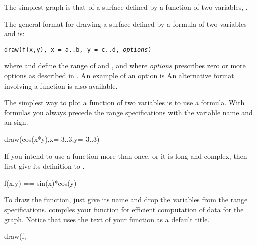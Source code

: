 The simplest \threedim{} graph is that of a surface defined by a function
of two variables, .

%
\beginImportant
The general format for drawing a surface defined by a formula 
of two variables  and  is:
%
\begin{center}
{\tt draw(f(x,y), x = a..b, y = c..d, {\it options})}
\end{center}
where  and  define the range of 
and , and where {\it options} prescribes zero or more
options as described in .
An example of an option is 
An alternative format involving a function  is also
available.
\endImportant

%
\begin{psXtc}
\begin{xtccomment}
The simplest way to plot a function of two variables is to use a formula.
With formulas you always precede the range specifications with
the variable name and an \spadSyntax{=} sign.
\end{xtccomment}
\begin{spadsrc}
draw(cos(x*y),x=-3..3,y=-3..3)
\end{spadsrc}
\end{psXtc}
%
\begin{xtc}
\begin{xtccomment}
If you intend to use a function more than once,
or it is long and complex, then first
give its definition to \Language{}.
\end{xtccomment}
\begin{spadsrc}
f(x,y) == sin(x)*cos(y) 
\end{spadsrc}
\end{xtc}
%
%
\begin{psXtc}
\begin{xtccomment}
To draw the function, just give its name and drop the variables
from the range specifications.
\Language{} compiles your function for efficient computation
of data for the graph.
Notice that \Language{} uses the text of your function as a
default title.
\end{xtccomment}
\begin{spadsrc}
draw(f,-%
\end{spadsrc}
\end{psXtc}

